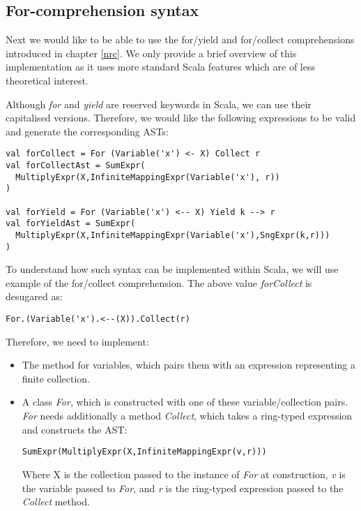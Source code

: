 \subsection{For-comprehension syntax}

Next we would like to be able to use the for/yield and for/collect comprehensions introduced in chapter \ref{nrc}. We only provide a brief overview of this implementation as it uses more standard Scala features which are of less theoretical interest.

Although \textit{for} and \textit{yield} are reserved keywords in Scala, we can use their capitalised versions. Therefore, we would like the following expressions to be valid and generate the corresponding ASTs:

\vs \begin{lstlisting}
val forCollect = For (Variable('x') <- X) Collect r
val forCollectAst = SumExpr(
  MultiplyExpr(X,InfiniteMappingExpr(Variable('x'), r))
)

val forYield = For (Variable('x') <-- X) Yield k --> r 
val forYieldAst = SumExpr(
  MultiplyExpr(X,InfiniteMappingExpr(Variable('x'),SngExpr(k,r)))
)
\end{lstlisting} \vs

To understand how such syntax can be implemented within Scala, we will use example of the for/collect comprehension. The above value \textit{forCollect} is desugared as:
\vs \begin{lstlisting}
For.(Variable('x').<--(X)).Collect(r)
\end{lstlisting}\vs
Therefore, we need to implement:
\begin{itemize}
\item{The \lin{<--} method for variables, which pairs them with an expression  representing a finite collection.}
\item{A class  \textit{For}, which is constructed with one of these variable/collection pairs. \textit{For} needs additionally a method \textit{Collect}, which takes a ring-typed expression and constructs the AST:
\vs\begin{lstlisting}
SumExpr(MultiplyExpr(X,InfiniteMappingExpr(v,r)))
\end{lstlisting}\vs
Where X is the collection passed to the instance of \textit{For} at construction, \textit{v} is the variable passed to \textit{For}, and \textit{r} is the ring-typed expression passed to the \textit{Collect} method.
}
\end{itemize}

